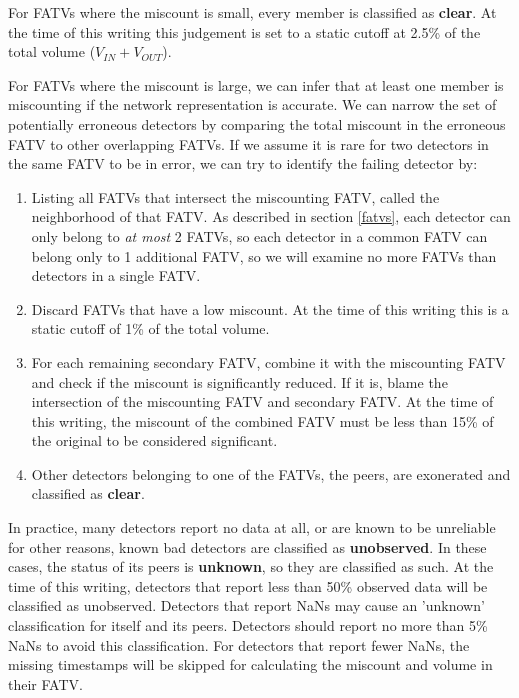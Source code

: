 \documentclass[titlepage]{article}
\begin{document}
For FATVs where the miscount is small, every member is classified as \textbf{clear}. At the time of this writing this judgement is set to a static cutoff at 2.5\% of the total volume ($V_{IN} + V_{OUT}$).

For FATVs where the miscount is large, we can infer that at least one member is miscounting if the network representation is accurate. We can narrow the set of potentially erroneous detectors by comparing the total miscount in the erroneous FATV to other overlapping FATVs. If we assume it is rare for two detectors in the same FATV to be in error, we can try to identify the failing detector by:
\begin{enumerate}
	\item Listing all FATVs that intersect the miscounting FATV, called the neighborhood of that FATV. As described in section \ref{fatvs}, each detector can only belong to \textit{at most} 2 FATVs, so each detector in a common FATV can belong only to 1 additional FATV, so we will examine no more FATVs than detectors in a single FATV.
	\item Discard FATVs that have a low miscount. At the time of this writing this is a static cutoff of 1\% of the total volume.
	\item For each remaining secondary FATV, combine it with the miscounting FATV and check if the miscount is significantly reduced. If it is, blame the intersection of the miscounting FATV and secondary FATV. At the time of this writing, the miscount of the combined FATV must be less than 15\% of the original to be considered significant.
	\item Other detectors belonging to one of the FATVs, the peers, are exonerated and classified as \textbf{clear}.
\end{enumerate}

In practice, many detectors report no data at all, or are known to be unreliable for other reasons, known bad detectors are classified as \textbf{unobserved}. In these cases, the status of its peers is \textbf{unknown}, so they are classified as such. At the time of this writing, detectors that report less than 50\% observed data will be classified as unobserved. Detectors that report NaNs may cause an 'unknown' classification for itself and its peers. Detectors should report no more than 5\% NaNs to avoid this classification. For detectors that report fewer NaNs, the missing timestamps will be skipped for calculating the miscount and volume in their FATV.
\end{document}
